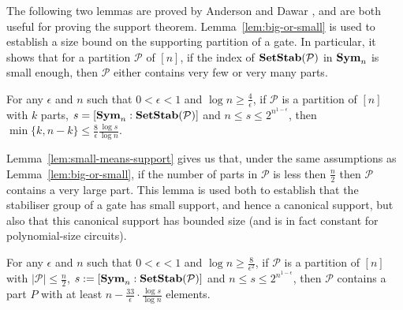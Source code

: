 \documentclass[../paper.tex]{subfiles}
\begin{document}
The following two lemmas are proved by Anderson and Dawar \cite{AndersonD17},
and are both useful for proving the support theorem.
Lemma~\ref{lem:big-or-small} is used to establish a size bound on the supporting
partition of a gate. In particular, it shows that for a partition $\mathcal{P}$
of $[n]$, if the index of $\text{\textbf{SetStab}} (\mathcal{P})$ in $\text{\textbf{Sym}}_n$ is small enough,
then $\mathcal{P}$ either contains very few or very many parts.

\begin{lem}
  \label{lem:big-or-small}
  For any $\epsilon$ and $n$ such that $0 < \epsilon < 1$ and $\log n \geq
  \frac{4}{\epsilon}$, if $\mathcal{P}$ is a partition of $[n]$ with $k$ parts,
  $s = [\text{\textbf{Sym}}_n : \text{\textbf{SetStab}} (\mathcal{P})]$ and $n \leq s \leq
  2^{n^{1-\epsilon}}$, then $\min \{k, n-k\} \leq \frac{8}{\epsilon} \frac{\log
    s}{\log n}$.
\end{lem}

Lemma~\ref{lem:small-means-support} gives us that, under the same assumptions as
Lemma~\ref{lem:big-or-small}, if the number of parts in $\mathcal{P}$ is less
then $\frac{n}{2}$ then $\mathcal{P}$ contains a very large part. This lemma is
used both to establish that the stabiliser group of a gate has small support,
and hence a canonical support, but also that this canonical support has bounded
size (and is in fact constant for polynomial-size circuits).

\begin{lem}
  \label{lem:small-means-support}
  For any $\epsilon$ and $n$ such that $0 < \epsilon < 1$ and $\log n \geq
  \frac{8}{\epsilon^2}$, if $\mathcal{P}$ is a partition of $[n]$ with $\vert
  \mathcal{P} \vert \leq \frac{n}{2}$, $s:= [\text{\textbf{Sym}}_n : \text{\textbf{SetStab}} (\mathcal{P})]$
  and $n \leq s \leq 2^{n^{1-\epsilon}}$, then $\mathcal{P}$ contains a part $P$
  with at least $n - \frac{33}{\epsilon} \cdot \frac{\log s} {\log n}$ elements.
\end{lem}

\end{document}
